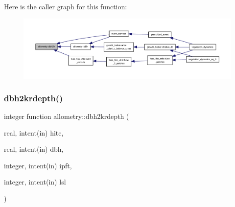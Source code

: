Here is the caller graph for this function\+:
\nopagebreak
\begin{figure}[H]
\begin{center}
\leavevmode
\includegraphics[width=350pt]{namespaceallometry_a56f11dc07da4d5e7114dc37d6cc5f2cc_icgraph}
\end{center}
\end{figure}
\mbox{\label{namespaceallometry_ac1523ea0e0ef8d2dd6a429f61a013c1c}} 
\subsubsection{\texorpdfstring{dbh2krdepth()}{dbh2krdepth()}}
{\footnotesize\ttfamily integer function allometry\+::dbh2krdepth (\begin{DoxyParamCaption}\item[{real, intent(in)}]{hite,  }\item[{real, intent(in)}]{dbh,  }\item[{integer, intent(in)}]{ipft,  }\item[{integer, intent(in)}]{lsl }\end{DoxyParamCaption})}

